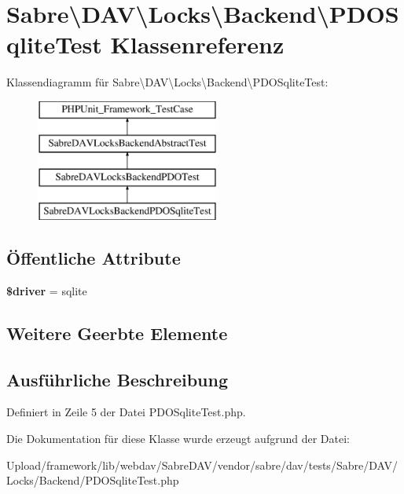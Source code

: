 \hypertarget{class_sabre_1_1_d_a_v_1_1_locks_1_1_backend_1_1_p_d_o_sqlite_test}{}\section{Sabre\textbackslash{}D\+AV\textbackslash{}Locks\textbackslash{}Backend\textbackslash{}P\+D\+O\+Sqlite\+Test Klassenreferenz}
\label{class_sabre_1_1_d_a_v_1_1_locks_1_1_backend_1_1_p_d_o_sqlite_test}
Klassendiagramm für Sabre\textbackslash{}D\+AV\textbackslash{}Locks\textbackslash{}Backend\textbackslash{}P\+D\+O\+Sqlite\+Test\+:\begin{figure}[H]
\begin{center}
\leavevmode
\includegraphics[height=4.000000cm]{class_sabre_1_1_d_a_v_1_1_locks_1_1_backend_1_1_p_d_o_sqlite_test}
\end{center}
\end{figure}
\subsection*{Öffentliche Attribute}
\begin{DoxyCompactItemize}
\item 
\mbox{\label{class_sabre_1_1_d_a_v_1_1_locks_1_1_backend_1_1_p_d_o_sqlite_test_a280e8b61f9313f907c9063f8c75ef7d9}} 
{\bfseries \$driver} = \textquotesingle{}sqlite\textquotesingle{}
\end{DoxyCompactItemize}
\subsection*{Weitere Geerbte Elemente}


\subsection{Ausführliche Beschreibung}


Definiert in Zeile 5 der Datei P\+D\+O\+Sqlite\+Test.\+php.



Die Dokumentation für diese Klasse wurde erzeugt aufgrund der Datei\+:\begin{DoxyCompactItemize}
\item 
Upload/framework/lib/webdav/\+Sabre\+D\+A\+V/vendor/sabre/dav/tests/\+Sabre/\+D\+A\+V/\+Locks/\+Backend/P\+D\+O\+Sqlite\+Test.\+php\end{DoxyCompactItemize}
